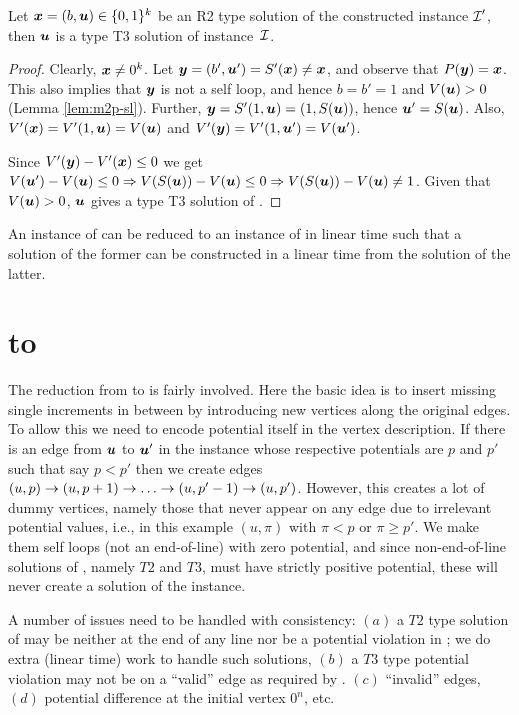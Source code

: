 \begin{lemma}\label{lem:m2p-r2}
Let $\mbox{\boldmath $x$}=(b,\mbox{\boldmath $u$})\in \{0,1\}^k$ be an R2 type solution of the constructed \EOPL instance $\mbox{${\mathcal I}$}'$, then $\mbox{\boldmath $u$}$ is a type T3 solution of \EOML instance~$\mbox{${\mathcal I}$}$.
\end{lemma}
\begin{proof}
Clearly, $\mbox{\boldmath $x$}\neq 0^k$. Let $\mbox{\boldmath $y$} = (b',\mbox{\boldmath $u$}') = S'(\mbox{\boldmath $x$}) \neq \mbox{\boldmath $x$}$, and observe that $P(\mbox{\boldmath $y$}) = \mbox{\boldmath $x$}$. This also implies that $\mbox{\boldmath $y$}$ is not a self loop, and hence $b=b'=1$ and $V(\mbox{\boldmath $u$})>0$ (Lemma \ref{lem:m2p-sl}). Further, $\mbox{\boldmath $y$} = S'(1,\mbox{\boldmath $u$})=(1,S(\mbox{\boldmath $u$}))$, hence $\mbox{\boldmath $u$}'=S(\mbox{\boldmath $u$})$. Also, $V'(\mbox{\boldmath $x$})=V'(1,\mbox{\boldmath $u$})=V(\mbox{\boldmath $u$})$ and $V'(\mbox{\boldmath $y$})=V'(1,\mbox{\boldmath $u$}')=V(\mbox{\boldmath $u$}')$. 

Since $V'(\mbox{\boldmath $y$})-V'(\mbox{\boldmath $x$})\le 0$ we get $V(\mbox{\boldmath $u$}')-V(\mbox{\boldmath $u$})\le 0 \Rightarrow V(S(\mbox{\boldmath $u$})) - V(\mbox{\boldmath $u$}) \le 0\Rightarrow V(S(\mbox{\boldmath $u$})) - V(\mbox{\boldmath $u$})\neq 1$. Given that $V(\mbox{\boldmath $u$})>0$, $\mbox{\boldmath $u$}$ gives a type T3 solution of \EOML.
\end{proof}

\begin{theorem}\label{thm:m2p}
An instance of \EOML can be reduced to an instance of \EOPL in linear time such that a solution of the former can be constructed in a linear time from the solution of the latter. 
\end{theorem}

\section{\EOPL to \EOML}
\label{sec:eopl2eoml}

The reduction from \EOPL to \EOML is fairly involved. Here the basic idea is to insert missing single
increments in between by introducing new vertices along the original edges. To
allow this we need to encode potential itself in the vertex description. If
there is an edge from $\mbox{\boldmath $u$}$ to $\mbox{\boldmath $u$}'$ in the \EOPL instance whose respective
potentials are $p$ and $p'$ such that say $p<p'$ then we create edges $(u,p)\ra
(u,p+1)\ra \dots \ra (u,p'-1)\ra (u,p')$. However, this creates a lot of dummy
vertices, namely those that never appear on any edge due to irrelevant potential
values, i.e., in this example $(u,\pi)$ with $\pi <p$ or $\pi\ge p'$. We make
them self loops (not an end-of-line) with zero potential, and since
non-end-of-line solutions of \EOML, namely $T2$ and $T3$, must have strictly
positive potential, these will never create a solution of the \EOML instance.

A number of issues need to be handled with consistency: $(a)$
a $T2$ type solution of \EOML may be neither at the end of any line nor be a 
potential violation in \EOPL; we do extra (linear time) work to handle such
solutions, $(b)$ a $T3$ type potential violation may not be on a ``valid'' edge as
required by \EOPL. $(c)$ ``invalid'' edges, $(d)$ potential difference at the
initial vertex $0^n$, etc.

